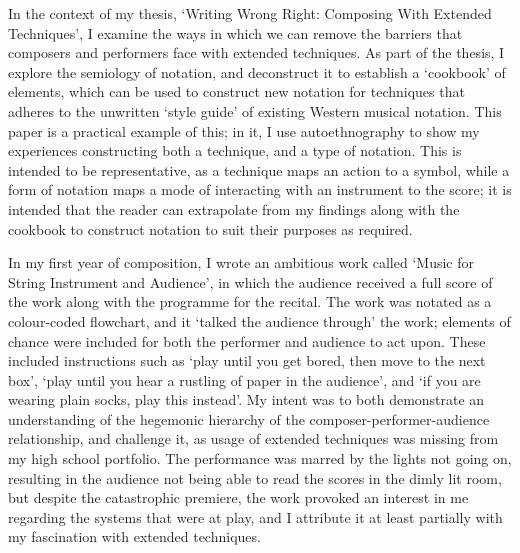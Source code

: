 In the context of my thesis, `Writing Wrong Right: Composing With Extended Techniques', I examine the ways in which we can remove the barriers that composers and performers face with extended techniques.
As part of the thesis, I explore the semiology of notation, and deconstruct it to establish a `cookbook' of elements, which can be used to construct new notation for techniques that adheres to the unwritten `style guide' of existing Western musical notation.
This paper is a practical example of this; in it, I use autoethnography to show my experiences constructing both a technique, and a type of notation. 
This is intended to be representative, as a technique maps an action to a symbol, while a form of notation maps a mode of interacting with an instrument to the score;
it is intended that the reader can extrapolate from my findings along with the cookbook to construct notation to suit their purposes as required.

In my first year of composition, I wrote an ambitious work called `Music for String Instrument and Audience', in which the audience received a full score of the work along with the programme for the recital.
The work was notated as a colour-coded flowchart, and it `talked the audience through' the work; elements of chance were included for both the performer and audience to act upon.
These included instructions such as `play until you get bored, then move to the next box', `play until you hear a rustling of paper in the audience', and `if you are wearing plain socks, play this instead'.
My intent was to both demonstrate an understanding of the hegemonic hierarchy of the composer-performer-audience relationship, and challenge it, as usage of extended techniques was missing from my high school portfolio.
The performance was marred by the lights not going on, resulting in the audience not being able to read the scores in the dimly lit room, but despite the catastrophic premiere, the work provoked an interest in me regarding the systems that were at play, and I attribute it at least partially with my fascination with extended techniques.
